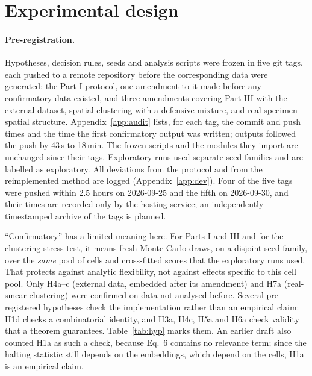 \documentclass[11pt]{article}
\theoremstyle{remark}
\theoremstyle{definition}
\begin{document}
\section{Experimental design}\label{sec:design}
\paragraph{Pre-registration.} Hypotheses, decision rules, seeds and analysis scripts were frozen in five git tags, each pushed to a remote repository before the corresponding data were generated: the Part I protocol, one amendment to it made before any confirmatory data existed, and three amendments covering Part III with the external dataset, spatial clustering with a defensive mixture, and real-specimen spatial structure. Appendix~\ref{app:audit} lists, for each tag, the commit and push times and the time the first confirmatory output was written; outputs followed the push by 43\,s to 18\,min. The frozen scripts and the modules they import are unchanged since their tags. Exploratory runs used separate seed families and are labelled as exploratory. All deviations from the protocol and from the reimplemented method are logged (Appendix~\ref{app:dev}). Four of the five tags were pushed within 2.5 hours on 2026-09-25 and the fifth on 2026-09-30, and their times are recorded only by the hosting service; an independently timestamped archive of the tags is planned.

``Confirmatory'' has a limited meaning here. For Parts I and III and for the clustering stress test, it means fresh Monte Carlo draws, on a disjoint seed family, over the \emph{same} pool of cells and cross-fitted scores that the exploratory runs used. That protects against analytic flexibility, not against effects specific to this cell pool. Only H4a--c (external data, embedded after its amendment) and H7a (real-smear clustering) were confirmed on data not analysed before. Several pre-registered hypotheses check the implementation rather than an empirical claim: H1d checks a combinatorial identity, and H3a, H4c, H5a and H6a check validity that a theorem guarantees. Table~\ref{tab:hyp} marks them. An earlier draft also counted H1a as such a check, because Eq.~6 contains no relevance term; since the halting statistic still depends on the embeddings, which depend on the cells, H1a is an empirical claim.
\end{document}
